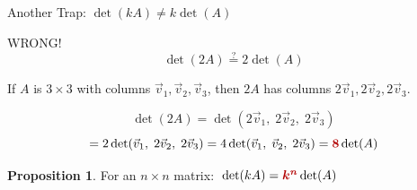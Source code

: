 \documentclass[10pt]{beamer}
\theoremstyle{definition}
\newtheorem{prop}{Proposition}[section]
\newcommand{\rd}[1]{{\color{red!70!black}#1}}
\begin{document}
\begin{frame}{Another Trap: $\det(kA) \neq k\det(A)$}

\begin{exampleblock}{\rd{WRONG!}}
$$
\det(2A) \stackrel{?}{=} 2\det(A)
$$
\end{exampleblock}

\vfill
\pause

If $A$ is $3 \times 3$ with columns $\vec{v}_1, \vec{v}_2, \vec{v}_3$, then $2A$ has columns $2\vec{v}_1, 2\vec{v}_2, 2\vec{v}_3$.

$$
\det(2A) = \det(2\vec{v}_1,\; 2\vec{v}_2,\; 2\vec{v}_3)
$$
$$
= 2\det(\vec{v}_1,\; 2\vec{v}_2,\; 2\vec{v}_3)
= 4\det(\vec{v}_1,\; \vec{v}_2,\; 2\vec{v}_3)
= {\color{red!70!black}\boldsymbol{8}}\det(A)
$$

\vfill

\begin{prop}
For an $n \times n$ matrix: $\;\det(kA) = {\color{red!70!black}\boldsymbol{k^n}} \det(A)$
\end{prop}

\end{frame}
\end{document}
